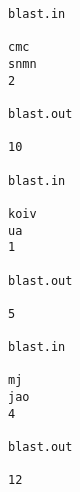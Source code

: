 \begin{verbatim}
blast.in 
 
cmc 
snmn 
2 
 
blast.out 
 
10 

blast.in 
 
koiv 
ua 
1 
 
blast.out 
 
5

blast.in 
 
mj 
jao 
4 
 
blast.out 
 
12 

\end{verbatim}